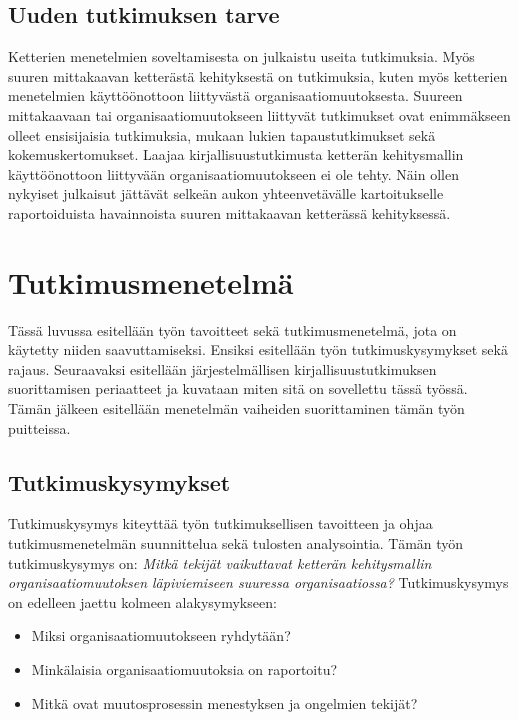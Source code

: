 \subsection{Uuden tutkimuksen tarve}
Ketterien menetelmien soveltamisesta on julkaistu useita tutkimuksia. Myös
suuren mittakaavan ketterästä kehityksestä on tutkimuksia, kuten myös ketterien
menetelmien käyttöönottoon liittyvästä organisaatiomuutoksesta. Suureen
mittakaavaan tai organisaatiomuutokseen liittyvät tutkimukset ovat enimmäkseen
olleet ensisijaisia tutkimuksia, mukaan lukien tapaustutkimukset sekä
kokemuskertomukset. Laajaa kirjallisuustutkimusta ketterän kehitysmallin
käyttöönottoon liittyvään organisaatiomuutokseen ei ole tehty. Näin ollen
nykyiset julkaisut jättävät selkeän aukon yhteenvetävälle kartoitukselle
raportoiduista havainnoista suuren mittakaavan ketterässä kehityksessä.

\clearpage
\section{Tutkimusmenetelmä}
\label{sec:menetelma}

Tässä luvussa esitellään työn tavoitteet sekä tutkimusmenetelmä, jota on
käytetty niiden saavuttamiseksi. Ensiksi esitellään työn tutkimuskysymykset sekä
rajaus. Seuraavaksi esitellään järjestelmällisen kirjallisuustutkimuksen
suorittamisen periaatteet ja kuvataan miten sitä on sovellettu tässä työssä.
Tämän jälkeen esitellään menetelmän vaiheiden suorittaminen tämän työn
puitteissa.

\subsection{Tutkimuskysymykset}
Tutkimuskysymys kiteyttää työn tutkimuksellisen tavoitteen ja ohjaa
tutkimusmenetelmän suunnittelua sekä tulosten analysointia. Tämän työn
tutkimuskysymys on: \textit{Mitkä tekijät vaikuttavat ketterän kehitysmallin
organisaatiomuutoksen läpiviemiseen suuressa organisaatiossa?} Tutkimuskysymys
on edelleen jaettu kolmeen alakysymykseen:

\begin{itemize}
\item Miksi organisaatiomuutokseen ryhdytään?
\item Minkälaisia organisaatiomuutoksia on raportoitu?
\item Mitkä ovat muutosprosessin menestyksen ja ongelmien tekijät?
\end{itemize}

